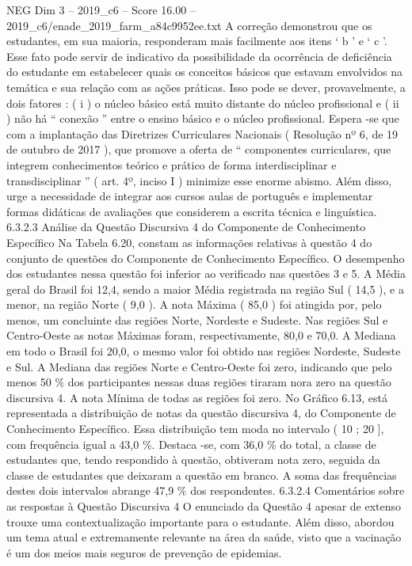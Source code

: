 \begin{textsample}{NEG Dim 3 – 2019\_c6 – Score 16.00 – 2019\_c6/enade\_2019\_farm\_a84c9952ee.txt}
A correção demonstrou que os estudantes, em sua maioria, responderam mais facilmente aos itens ‘ b ’ e ‘ c ’.
Esse fato pode servir de indicativo da possibilidade da ocorrência de deficiência do estudante em estabelecer quais os conceitos básicos que estavam envolvidos na temática e sua relação com as ações práticas.
Isso pode se dever, provavelmente, a dois fatores : ( i ) o núcleo básico está muito distante do núcleo profissional e ( ii ) não há “ conexão ” entre o ensino básico e o núcleo profissional.
Espera -se que com a implantação das Diretrizes Curriculares Nacionais ( Resolução nº 6, de 19 de outubro de 2017 ), que promove a oferta de “ componentes curriculares, que integrem conhecimentos teórico e prático de forma interdisciplinar e transdisciplinar ” ( art. 4º, inciso I ) minimize esse enorme abismo.
Além disso, urge a necessidade de integrar aos cursos aulas de português e implementar formas didáticas de avaliações que considerem a escrita técnica e linguística. 6.3.2.3 Análise da Questão Discursiva 4 do Componente de Conhecimento Específico Na Tabela 6.20, constam as informações relativas à questão 4 do conjunto de questões do Componente de Conhecimento Específico.
O desempenho dos estudantes nessa questão foi inferior ao verificado nas questões 3 e 5.
A Média geral do Brasil foi 12,4, sendo a maior Média registrada na região Sul ( 14,5 ), e a menor, na região Norte ( 9,0 ).
A nota Máxima ( 85,0 ) foi atingida por, pelo menos, um concluinte das regiões Norte, Nordeste e Sudeste.
Nas regiões Sul e Centro-Oeste as notas Máximas foram, respectivamente, 80,0 e 70,0.
A Mediana em todo o Brasil foi 20,0, o mesmo valor foi obtido nas regiões Nordeste, Sudeste e Sul.
A Mediana das regiões Norte e Centro-Oeste foi zero, indicando que pelo menos 50 \% dos participantes nessas duas regiões tiraram nora zero na questão discursiva 4.
A nota Mínima de todas as regiões foi zero.
No Gráfico 6.13, está representada a distribuição de notas da questão discursiva 4, do Componente de Conhecimento Específico.
Essa distribuição tem moda no intervalo ( 10 ; 20 ], com frequência igual a 43,0 \%.
Destaca -se, com 36,0 \% do total, a classe de estudantes que, tendo respondido à questão, obtiveram nota zero, seguida da classe de estudantes que deixaram a questão em branco.
A soma das frequências destes dois intervalos abrange 47,9 \% dos respondentes. 6.3.2.4 Comentários sobre as respostas à Questão Discursiva 4 O enunciado da Questão 4 apesar de extenso trouxe uma contextualização importante para o estudante.
Além disso, abordou um tema atual e extremamente relevante na área da saúde, visto que a vacinação é um dos meios mais seguros de prevenção de epidemias.

\end{textsample}
